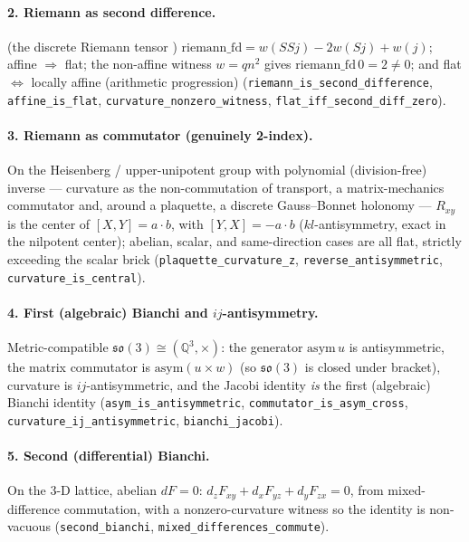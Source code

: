 \documentclass[10pt,twocolumn]{article}
\theoremstyle{definition}
\newcommand{\code}[1]{\texttt{#1}}
\begin{document}
\paragraph{2. Riemann as second difference.} (the discrete Riemann tensor
\cite{riemann1868})
$\mathrm{riemann\_fd} = w(SSj) - 2w(Sj) + w(j)$; affine $\Rightarrow$ flat; the non-affine
witness $w=q n^2$ gives $\mathrm{riemann\_fd}\,0 = 2\ne 0$; and flat $\iff$ locally affine
(arithmetic progression) (\code{riemann\_is\_second\_difference}, \code{affine\_is\_flat},
\code{curvature\_nonzero\_witness}, \code{flat\_iff\_second\_diff\_zero}).

\paragraph{3. Riemann as commutator (genuinely 2-index).} On the Heisenberg /
upper-unipotent group with polynomial (division-free) inverse --- curvature as the
non-commutation of transport, a matrix-mechanics commutator \cite{bornjordan1925} and, around a
plaquette, a discrete Gauss--Bonnet holonomy \cite{gauss1828,bonnet1848} --- $R_{xy}$ is the
center of $[X,Y]=a\cdot b$, with $[Y,X]=-a\cdot b$ ($kl$-antisymmetry, exact in the nilpotent center);
abelian, scalar, and same-direction cases are all flat, strictly exceeding the scalar brick
(\code{plaquette\_curvature\_z}, \code{reverse\_antisymmetric}, \code{curvature\_is\_central}).

\paragraph{4. First (algebraic) Bianchi and $ij$-antisymmetry.} Metric-compatible
$\mathfrak{so}(3)\cong(\mathbb{Q}^3,\times)$: the generator $\mathrm{asym}\,u$ is
antisymmetric, the matrix commutator is $\mathrm{asym}(u\times w)$ (so $\mathfrak{so}(3)$ is
closed under bracket), curvature is $ij$-antisymmetric, and the Jacobi identity \emph{is} the
first (algebraic) Bianchi identity \cite{bianchi1902} (\code{asym\_is\_antisymmetric},
\code{commutator\_is\_asym\_cross},
\code{curvature\_ij\_antisymmetric}, \code{bianchi\_jacobi}).

\paragraph{5. Second (differential) Bianchi.} \cite{bianchi1902} On the 3-D lattice,
abelian $dF=0$:
$d_z F_{xy} + d_x F_{yz} + d_y F_{zx} = 0$, from mixed-difference commutation, with a
nonzero-curvature witness so the identity is non-vacuous (\code{second\_bianchi},
\code{mixed\_differences\_commute}).
\end{document}
